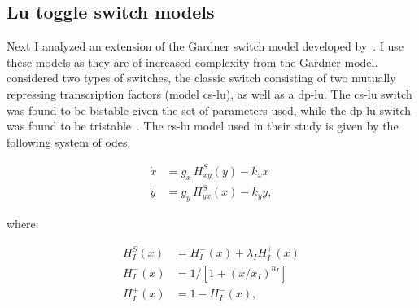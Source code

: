 \clearpage


\subsection{Lu toggle switch models}
\label{sec:lu}
Next I analyzed an extension of the Gardner switch model developed by~\textcite{Lu:2014kc}. I use these models as they are of increased complexity from the Gardner model. \textcite{Lu:2014kc} considered two types of switches, the classic switch consisting of two mutually repressing transcription factors (model \acrshort{cs-lu}), as well as a \acrfull{dp-lu}.  The \acrshort{cs-lu} switch was found to be bistable given the set of parameters used, while the \acrshort{dp-lu} switch was found to be tristable~\autocite{Lu:2014kc}. The \acrshort{cs-lu} model used in their study is given by the following system of \acrshort{ode}s.

\begin{align}
\dot{x} & = g_{x}\, H^{S}_{xy}(y) -k_{x}x \\
\dot{y} & = g_{y}\,H^{S}_{yx}(x) -k_{y}y,
\end{align}

where:

\begin{align}
H^{S}_{I}(x) &= H^{-}_{I}(x)+\lambda_{I}H^{+}_{I}(x) \\
H^{-}_{I}(x) &= 1 \big/\left[1+(x/x_{I})^{n_{I}}\right] \\
H^{+}_{I}(x) &= 1-H^{-}_{I}(x),
\end{align}

